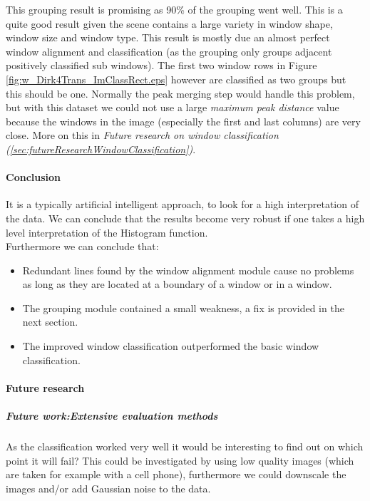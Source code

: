 This grouping result is promising as 90\% of the grouping went well.
This is a quite good result given the scene contains a large variety in window
shape, window size and window type.  This result is mostly due an almost perfect window alignment and classification 
(as the grouping only groups adjacent positively classified sub windows).
The first two window rows in Figure \ref{fig:w_Dirk4Trans_ImClassRect.eps}
however are classified as two groups but this should be one.
Normally the peak merging step would handle this problem, but with this dataset
we could not use a large \emph{maximum peak distance} value because the windows
in the image (especially the first and last columns) are very close.  More on
this in \emph{Future research on window classification
(\ref{sec:futureResearchWindowClassification})}.


\paragraph{Conclusion} %
It is a typically artificial intelligent approach, to look for a high
interpretation of the data.  We can conclude that the results become very robust
if one takes a high level interpretation of the Histogram function. \\
Furthermore we can conclude that:

\begin{itemize}
	\item Redundant lines found by the window alignment module cause no
problems as long as they are located at a boundary of a window or in a window.
	\item The grouping module contained a small weakness, a fix is provided in the next
	section.
	\item The improved window classification outperformed the basic window
	classification.
\end{itemize}

\paragraph{Future research} %
\label{sec:futureResearchWindowClassification}
\subparagraph{Future work:Extensive evaluation methods}
As the classification worked very well it would be interesting to find out on which
point it will fail?  This could be investigated by using low quality images (which are taken for
example with a cell phone), furthermore we could downscale the images and/or add
Gaussian noise to the data.\\

